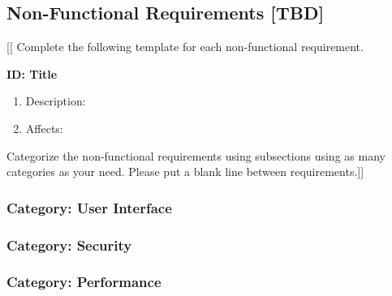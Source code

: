 \subsection{Non-Functional Requirements \textbf{[TBD]}}

[[ Complete the following template for each non-functional requirement. 


\textbf{ID: Title}
\begin{enumerate}
    \item Description:
    \item Affects: 
\end{enumerate}

Categorize the non-functional requirements using subsections using as many
categories as your need.
Please put a blank line between requirements.]]


\subsubsection{Category: User Interface}

\subsubsection{Category: Security}

\subsubsection{Category: Performance}

\pagebreak

